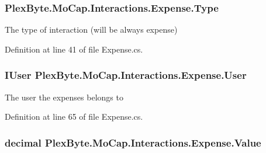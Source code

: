 \subsubsection[{\texorpdfstring{Type}{Type}}]{ Plex\+Byte.\+Mo\+Cap.\+Interactions.\+Expense.\+Type\hspace{0.3cm}{\ttfamily [get]}}\hypertarget{class_plex_byte_1_1_mo_cap_1_1_interactions_1_1_expense_a3152c1d7bf0ab00c5080ae1c6ff89b78}{}\label{class_plex_byte_1_1_mo_cap_1_1_interactions_1_1_expense_a3152c1d7bf0ab00c5080ae1c6ff89b78}


The type of interaction (will be always expense) 



Definition at line 41 of file Expense.\+cs.

\subsubsection[{\texorpdfstring{User}{User}}]{\setlength{\rightskip}{0pt plus 5cm}I\+User Plex\+Byte.\+Mo\+Cap.\+Interactions.\+Expense.\+User\hspace{0.3cm}{\ttfamily [get]}}\hypertarget{class_plex_byte_1_1_mo_cap_1_1_interactions_1_1_expense_ace5418670b51a3c323cc8860e0a16ef6}{}\label{class_plex_byte_1_1_mo_cap_1_1_interactions_1_1_expense_ace5418670b51a3c323cc8860e0a16ef6}


The user the expenses belongs to 



Definition at line 65 of file Expense.\+cs.

\subsubsection[{\texorpdfstring{Value}{Value}}]{\setlength{\rightskip}{0pt plus 5cm}decimal Plex\+Byte.\+Mo\+Cap.\+Interactions.\+Expense.\+Value\hspace{0.3cm}{\ttfamily [get]}}\hypertarget{class_plex_byte_1_1_mo_cap_1_1_interactions_1_1_expense_a35cdb298490671c1386fef1f1af31f3b}{}\label{class_plex_byte_1_1_mo_cap_1_1_interactions_1_1_expense_a35cdb298490671c1386fef1f1af31f3b}


